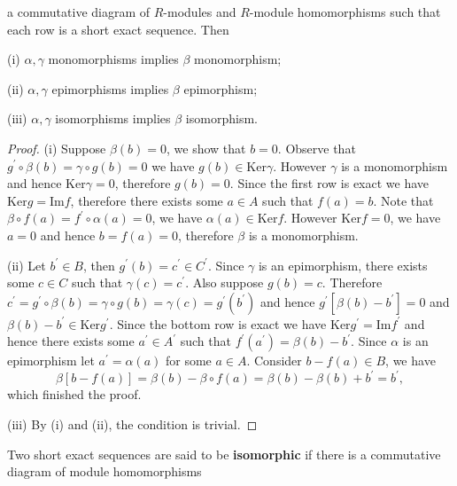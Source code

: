 \begin{lemma}
\begin{center}
\begin{tikzpicture}[x=0.75pt,y=0.75pt,yscale=-1,xscale=1]
\end{tikzpicture}
\end{center}
a commutative diagram of $R$-modules and $R$-module homomorphisms such that each row is a short exact sequence. Then \par
(i) $\alpha,\gamma$ monomorphisms implies $\beta$ monomorphism;\par
(ii) $\alpha,\gamma$ epimorphisms implies $\beta$ epimorphism;\par
(iii) $\alpha,\gamma$ isomorphisms implies $\beta$ isomorphism.
\end{lemma}
\begin{proof}
(i) Suppose $\beta(b)=0$, we show that $b=0$. Observe that $g^{\prime}\circ \beta \left( b \right) =\gamma \circ g\left( b \right) =0$ we have $g(b)\in\mathrm{Ker}\gamma$. However $\gamma$ is a monomorphism and hence $\mathrm{Ker}\gamma=0$, therefore $g(b)=0$. Since the first row is exact we have $\mathrm{Ker}g=\mathrm{Im}f$, therefore there exists some $a\in A$ such that $f(a)=b$. Note that $\beta \circ f\left( a \right) =f^{\prime}\circ \alpha \left( a \right) =0$, we have $\alpha(a)\in\mathrm{Ker}f$. However $\mathrm{Ker}f=0$, we have $a=0$ and hence $b=f(a)=0$, therefore $\beta$ is a monomorphism.\par
(ii) Let $b^\prime\in B$, then $g^\prime(b)=c^\prime\in C^\prime$. Since $\gamma$ is an epimorphism, there exists some $c\in C$ such that $\gamma(c)=c^\prime$. Also suppose $g(b)=c$. Therefore $c^{\prime}=g^{\prime}\circ \beta \left( b \right) =\gamma \circ g\left( b \right) =\gamma \left( c \right) =g^{\prime}\left( b^{\prime} \right) $ and hence $g^\prime[\beta(b)-b^\prime]=0$ and $\beta(b)-b^\prime\in\mathrm{Ker}g^\prime$. Since the bottom row is exact we have $\mathrm{Ker}g^\prime=\mathrm{Im}f^\prime$ and hence there exists some $a^\prime\in A^\prime$ such that $f^\prime(a^\prime)=\beta(b)-b^\prime$. Since $\alpha$ is an epimorphism let $a^\prime=\alpha(a)$ for some $a\in A$. Consider $b-f(a)\in B$, we have 
$$
\beta \left[ b-f\left( a \right) \right] =\beta \left( b \right) -\beta \circ f\left( a \right) =\beta \left( b \right) -\beta \left( b \right) +b^{\prime}=b^{\prime},
$$
which finished the proof.\par
(iii) By (i) and (ii), the condition is trivial.
\end{proof}
Two short exact sequences are said to be \textbf{isomorphic} if there is a commutative diagram of module homomorphisms 
